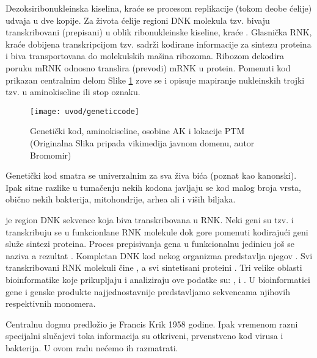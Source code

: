 Dezoksiribonukleinska kiselina, kraće  se procesom replikacije
(tokom deobe ćelije) udvaja u dve kopije. Za života ćelije regioni DNK
molekula tzv.  bivaju transkribovani (prepisani) u oblik
ribonukleinske kiseline, kraće . Glasnička RNK, kraće 
dobijena transkripcijom tzv.  sadrži kodirane informacije
za sintezu proteina i biva transportovana do molekulskih mašina ribozoma.
Ribozom dekodira poruku mRNK odnosno translira (prevodi) mRNK  u protein. Pomenuti kod prikazan centralnim delom
Slike \ref{fig:kod} zove se  i opisuje mapiranje nukleinskih
trojki tzv.  u aminokiseline ili stop oznaku.

\begin{figure}[]
\centering
\hspace*{-2.3cm} 
\texttt{[image: uvod/geneticcode]}
\caption { Genetički kod, aminokiseline, osobine AK i lokacije PTM\\
  \footnotesize
(Originalna Slika pripada vikimedija javnom domenu, autor Bromomir)}
\label{fig:kod}
\end{figure}

\clearpage

Genetički kod smatra se univerzalnim za sva živa bića (poznat kao kanonski). Ipak sitne razlike u
tumačenju nekih kodona javljaju se kod malog broja vrsta, obično nekih
bakterija, mitohondrije, arhea ali i viših biljaka.

 je region DNK sekvence
koja biva transkribovana u RNK.  Neki geni su tzv.   i
transkribuju se u funkcionlane RNK molekule dok gore pomenuti kodirajući geni
služe sintezi proteina.  Proces prepisivanja gena u funkcionalnu jedinicu još
se naziva  a rezultat .
Kompletan DNK kod nekog organizma predstavlja njegov
.  Svi transkribovani RNK molekuli čine ,
a svi sintetisani proteini .  Tri velike oblasti
bioinformatike koje prikupljaju i analiziraju ove podatke su:
,  i .
U bioinformatici gene i genske produkte najjednostavnije predstavljamo
sekvencama njihovih respektivnih monomera.


Centralnu dogmu predložio je Francis Krik 1958 godine. Ipak vremenom 
razni specijalni slučajevi toka informacija su otkriveni, prvenstveno kod
virusa i bakterija. U ovom radu nećemo ih razmatrati.

